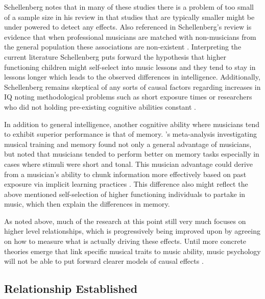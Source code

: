 \documentclass[]{book}
\begin{document}
Schellenberg \citep{schellenbergMusicNonmusicalAbilities2017} notes that in many of these studies there is a problem of too small of a sample size in his review \citep{corrigallAssociationsLengthMusic2011, parbery-clarkMusicalExperienceAging2011, straitMusicalTrainingEarly2012} in that studies that are typically smaller might be under powered to detect any effects.
Also referenced in Schellenberg's review is evidence that when professional musicians are matched with non-musicians from the general population these associations are non-existent \citep{schellenbergMusicTrainingSpeech2015}.
Interpreting the current literature Schellenberg puts forward the hypothesis that higher functioning children might self-select into music lessons and they tend to stay in lessons longer which leads to the observed differences in intelligence.
Additionally, Schellenberg remains skeptical of any sorts of causal factors regarding increases in IQ \citep{francoisMusicTrainingDevelopment2013, morenoMusicalTrainingInfluences2009} noting methodological problems such as short exposure times or researchers who did not holding pre-existing cognitive abilities constant \citep{mehrTwoRandomizedTrials2013}.

In addition to general intelligence, another cognitive ability where musicians tend to exhibit superior performance is that of memory.
\citet{talaminiMusiciansHaveBetter2017}'s meta-analysis investigating musical training and memory found not only a general advantage of musicians, but noted that musicians tended to perform better on memory tasks especially in cases where stimuli were short and tonal.
This musician advantage could derive from a musician's ability to chunk information more effectively based on past exposure via implicit learning practices \citep{ettlingerImplicitMemoryMusic2011, rohrmeierImplicitLearningAcquisition2012}.
This difference also might reflect the above mentioned self-selection of higher functioning individuals to partake in music, which then explain the differences in memory.

As noted above, much of the research at this point still very much focuses on higher level relationships, which is progressively being improved upon by agreeing on how to measure what is actually driving these effects.
Until more concrete theories emerge that link specific musical traits to music ability, music psychology will not be able to put forward clearer models of causal effects \citep{bakerExaminingMusicalSophistication2018}.

\hypertarget{relationship-established}{%
\subsection{Relationship Established}\label{relationship-established}}
\end{document}
